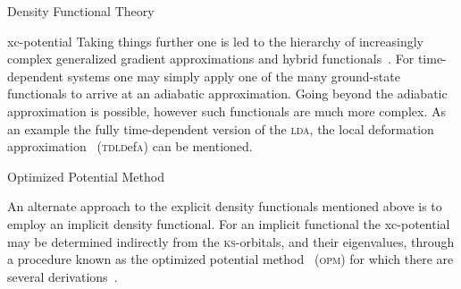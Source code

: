 \documentclass[letterpaper, 11 pt]{report}
\begin{document}
\begin{chapter}{Density Functional Theory \label{chap:dft}}
\begin{section}{xc-potential \label{sec:xcpot}}
      Taking things further one is led to the hierarchy of increasingly complex
      generalized gradient approximations and hybrid functionals~\cite{gga+}. For time-dependent systems
      one may simply apply one of the many ground-state functionals to arrive at an adiabatic
      approximation. Going beyond the adiabatic approximation is possible, however such functionals are
      much more complex. As an example the fully time-dependent version of the \textsc{lda}, the local
      deformation approximation~\cite{TDLDefA1, TDLDefA2} (\textsc{tdld}ef\textsc{a}) can be mentioned.

      \begin{subsection}{Optimized Potential Method \label{sec:opm}}

         An alternate approach to the explicit density functionals mentioned above is to employ an
         implicit density functional. For an implicit functional the xc-potential may be determined
         indirectly from the \textsc{ks}-orbitals, and their eigenvalues, through a procedure known as
         the optimized potential method~\cite{opm1, opm2} (\textsc{opm}) for which there are several
         derivations~\cite{opm1, opm2, opm3, opm4, opm5, opm-rev}.


\end{subsection}
\end{section}
\end{chapter}
\end{document}
